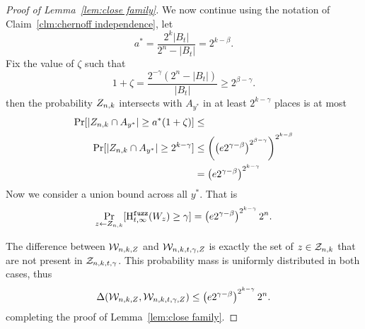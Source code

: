 \begin{proof}[Proof of Lemma~\ref{lem:close family}]
\noindent
We now continue using the notation of Claim~\ref{clm:chernoff independence}, let 
\[
a^* =\frac{2^k|B_t|}{2^n - |B_t|}=2^{k-\beta}.
\]
Fix the value of $\zeta$ such that 
\[1+\zeta = \frac{2^{-\gamma}(2^n - |B_t|)}{|B_t|} \ge 2^{\beta-\gamma}. \]
then the probability $Z_{n,k}$ intersects with $A_{y^*}$ in at least $2^{k-\gamma}$ places is at most 
\begin{align*}
\Pr[|Z_{n,k} \cap A_{y^*}| \ge a^*(1+\zeta)] &\le \\
\Pr[| Z_{n,k} \cap A_{y^*} | \ge 2^{k-\gamma}] &\le \left(\left(e2^{\gamma-\beta}\right)^{2^{\beta-\gamma}}\right)^{2^{k-\beta}} \\&= \left(e2^{\gamma-\beta}\right)^{2^{k-\gamma}}
\end{align*}
Now we consider a union bound across all $y^*$.  That is
\[
\Pr_{z\leftarrow Z_{n,k} }[\mathrm{H}^{\mathtt{fuzz}}_{t,\infty}(W_z)\ge \gamma] = \left(e2^{\gamma-\beta}\right)^{2^{k-\gamma}}2^n.
\]

The difference between $\mathcal{W}_{n,k, Z}$ and $\mathcal{W}_{n,k,t,\gamma, Z}$ is exactly the set of $z\in\mathcal{Z}_{n,k}$ that are not present in $\mathcal{Z}_{n,k,t,\gamma}$.  This probability mass is uniformly distributed in both cases, thus 
\[
\Delta(\mathcal{W}_{n,k, Z}, \mathcal{W}_{n,k,t,\gamma, Z}) \le \left(e2^{\gamma-\beta}\right)^{2^{k-\gamma}}2^n.
\]
completing the proof of Lemma~\ref{lem:close family}.
\end{proof}


